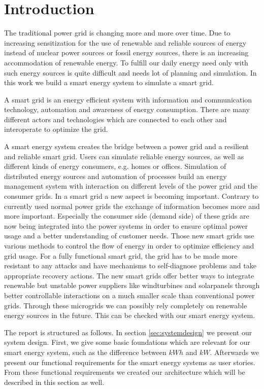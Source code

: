 \section{Introduction}

The traditional power grid is changing more and more over time.
Due to increasing sensitization for the use of renewable and reliable sources of energy instead of nuclear power sources or fossil energy sources, there is an increasing accommodation of renewable energy.
To fulfill our daily energy need only with such energy sources is quite difficult and needs lot of planning and simulation.
In this work we build a smart energy system to simulate a smart grid.

A smart grid is an energy efficient system with information and communication technology, automation and awareness of energy consumption.
There are many different actors and technologies which are connected to each other and interoperate to optimize the grid.

A smart energy system creates the bridge between a power grid and a resilient and reliable smart grid.
Users can simulate reliable energy sources, as well as different kinds of energy consumers, e.g. homes or offices.
Simulation of distributed energy sources and automation of processes build an energy management system with interaction on different levels of the power grid and the consumer grids.
In a smart grid a new aspect is becoming important.
Contrary to currently used normal power grids the exchange of information becomes more and more important.
Especially the consumer side (demand side) of these grids are now being integrated into the power systems in order to ensure optimal power usage and a better understanding of customer needs.
Those new smart grids use various methods to control the flow of energy in order to optimize efficiency and grid usage.
For a fully functional smart grid, the grid has to be made more resistant to any attacks and have mechanisms to self-diagnose problems and take appropriate recovery actions.
The new smart grids offer better ways to integrate renewable but unstable power suppliers like  windturbines and solarpanels through better controllable interactions on a much smaller scale than conventional power grids. 
Through these microgrids we can possibly rely completely on renewable energy sources in the future.
This can be checked with our smart energy system.

The report is structured as follows.
In section \ref{sec:systemdesign} we present our system design.
First, we give some basic foundations which are relevant for our smart energy system, such as the difference between $kWh$ and $kW$.
Afterwards we present our functional requirements for the smart energy systems as user stories.
From these functional requirements we created our architecture which will be described in this section as well.

